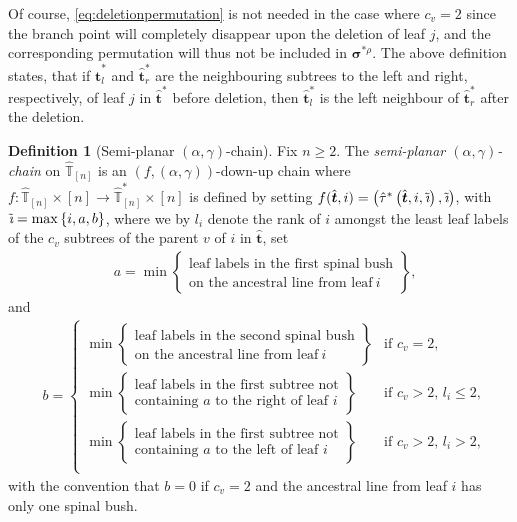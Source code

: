\documentclass[a4paper, final]{amsart}
\theoremstyle{plain}
\theoremstyle{definition}
\newtheorem{defi}[thm]{Definition}
\newcommand{\that}[1][t]{\hat{\boldsymbol{#1}}} %
\newcommand{\treesigma}[1][\sigma]{\boldsymbol{#1}}
\newcommand{\Thatspace}[1][\T]{\widehat{\boldsymbol{#1}}} %
\newcommand{\T}{\mathbb{T}}
\DeclareMathOperator{\tildei}{\tilde{\textit{\i}}}
\begin{document}
%
Of course, \eqref{eq:deletionpermutation} is not needed in the case where $c_v = 2$ since the branch point will completely disappear upon the deletion of leaf $j$, and the corresponding permutation will thus not be included in $\treesigma^{* \rho}$.
The above definition states, that if $\that_{l}^*$ and $\that_{r}^*$ are the neighbouring subtrees to the left and right, respectively, of leaf $j$ in $\that^*$ before deletion, then $\that_l^*$ is the left neighbour of $\that_r^*$ after the deletion.
%
\begin{defi}[Semi-planar $(\alpha, \gamma)$-chain]\label{def:planaralphagammachain}
  Fix $n \geq 2$.
  The \textit{semi-planar $(\alpha, \gamma)$-chain} on $\Thatspace_{[n]}$ is an $(f, (\alpha, \gamma))$-down-up chain where $f \colon \Thatspace_{[n]} \times [n] \to \Thatspace_{[n]}^* \times [n]$ is defined by setting $f(\that, i) = \left( \hat{\tau}^* \left( \that, i, \tildei \right), \tildei \right)$, with $\tildei = \max \left\{ i, a, b \right\}$, where we by $l_i$ denote the rank of $i$ amongst the least leaf labels of the $c_v$ subtrees of the parent $v$ of $i$ in $\that$, set
  \begin{align*}
    &a = \min
    \begin{Bmatrix}
      \text{leaf labels in the first spinal bush} \\ \text{on the ancestral line from leaf}\ i
    \end{Bmatrix},
  \end{align*}
  and
  \begin{align*}
    &b = 
    \begin{cases}
      \min
      \begin{Bmatrix}
        \text{leaf labels in the second spinal bush} \\ \text{on the ancestral line from leaf}\ i
      \end{Bmatrix}
      & \text{if $c_v = 2$}, \\
      \min
      \begin{Bmatrix}
        \text{leaf labels in the first subtree not} \\ \text{containing $a$ to the right of leaf $i$}
      \end{Bmatrix}
      & \text{if $c_v > 2$, $l_i \leq 2$}, \\
      \min
      \begin{Bmatrix}
        \text{leaf labels in the first subtree not} \\ \text{containing $a$ to the left of leaf $i$}
      \end{Bmatrix}
      & \text{if $c_v > 2$, $l_i > 2$}, \\
    \end{cases}
  \end{align*}
  with the convention that $b = 0$ if $c_v = 2$ and the ancestral line from leaf $i$ has only one spinal bush.
\end{defi}
\end{document}
